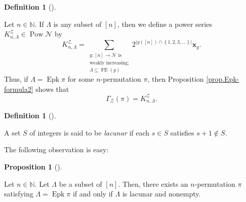 \documentclass[numbers=enddot,12pt,final,onecolumn,notitlepage]{scrartcl}%
\theoremstyle{definition}
\newtheorem{prop}[theo]{Proposition}
\newenvironment{proposition}[1][]
{\begin{prop}[#1]\begin{leftbar}}
{\end{leftbar}\end{prop}}
\newtheorem{defi}[theo]{Definition}
\newenvironment{definition}[1][]
{\begin{defi}[#1]\begin{leftbar}}
{\end{leftbar}\end{defi}}
\let\sumnonlimits\sum
\renewcommand{\sum}{\sumnonlimits\limits}
\begin{document}
\begin{definition}
\label{def.KnL}Let $n\in\mathbb{N}$. If $\Lambda$ is any subset of $\left[
n\right]  $, then we define a power series $K_{n,\Lambda}^{\mathcal{Z}}%
\in\operatorname*{Pow}\mathcal{N}$ by%
\begin{equation}
K_{n,\Lambda}^{\mathcal{Z}}=\sum_{\substack{g:\left[  n\right]  \rightarrow
\mathcal{N}\text{ is}\\\text{weakly increasing;}\\\Lambda\subseteq
\operatorname*{FE}\left(  g\right)  }}2^{\left\vert g\left(  \left[  n\right]
\right)  \cap\left\{  1,2,3,\ldots\right\}  \right\vert }\mathbf{x}_{g}.
\label{eq.def.KnL.1}%
\end{equation}
Thus, if $\Lambda=\operatorname*{Epk}\pi$ for some $n$-permutation $\pi$, then
Proposition \ref{prop.Epk-formula2} shows that%
\begin{equation}
\Gamma_{\mathcal{Z}}\left(  \pi\right)  =K_{n,\Lambda}^{\mathcal{Z}}.
\label{eq.def.KnL.2}%
\end{equation}

\end{definition}

\begin{definition}
A set $S$ of integers is said to be \textit{lacunar} if each $s\in S$
satisfies $s+1\notin S$.
\end{definition}

The following observation is easy:

\begin{proposition}
\label{prop.when-Epk}Let $n\in\mathbb{N}$. Let $\Lambda$ be a subset of
$\left[  n\right]  $. Then, there exists an $n$-permutation $\pi$ satisfying
$\Lambda=\operatorname*{Epk}\pi$ if and only if $\Lambda$ is lacunar and nonempty.
\end{proposition}
\end{document}
